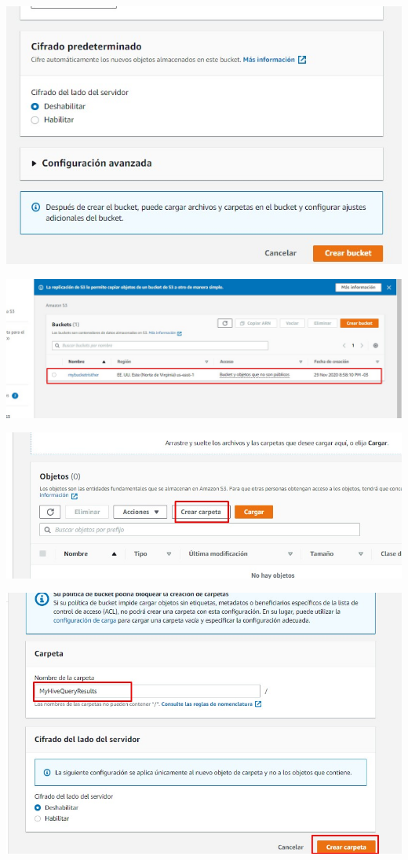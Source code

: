 \documentclass[12pt,letterpaper]{article}
\begin{document}
\begin{enumerate}
\begin{center}
	\end{center}
\begin{center}
	\includegraphics[width=14cm]{./img/1.2.3.jpg} 
\end{center}
	\begin{center}
	\includegraphics[width=14cm]{./img/1.2.4.jpg} 
\end{center}
\begin{center}
	\includegraphics[width=14cm]{./img/1.2.5.jpg} 
\end{center}
\begin{center}
	\includegraphics[width=14cm]{./img/1.2.6.jpg} 

\end{center}
\end{enumerate}
\end{document}
